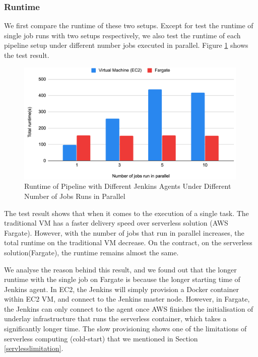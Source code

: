 \subsubsection{Runtime}
We first compare the runtime of these two setups. Except for test the runtime of single job runs with two setups respectively, we also test the runtime of each pipeline setup under different number jobs executed in parallel. Figure \ref{fig:runtime} shows the test result.
\begin{figure}[h]
\centering
\includegraphics[width=0.99\textwidth]{pics/runtime.png}
\caption{Runtime of Pipeline with Different Jenkins Agents Under Different Number of Jobs Runs in Parallel}
\label{fig:runtime}
\end{figure}
\par
The test result shows that when it comes to the execution of a single task. The traditional VM has a faster delivery speed over serverless solution (AWS Fargate). However, with the number of jobs that run in parallel increases, the total runtime on the traditional VM decrease. On the contract, on the serverless solution(Fargate), the runtime remains almost the same.
\par
We analyse the reason behind this result, and we found out that the longer runtime with the single job on Fargate is because the longer starting time of Jenkins agent. In EC2, the Jenkins will simply provision a Docker container within EC2 VM, and connect to the Jenkins master node. However, in Fargate, the Jenkins can only connect to the agent once AWS finishes the initialisation of underlay infrastructure that runs the serverless container, which takes a significantly longer time. The slow provisioning shows one of the limitations of serverless computing (cold-start) that we mentioned in Section \ref{servlesslimitation}.

